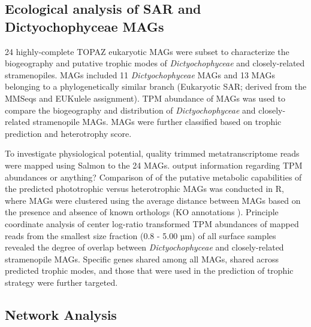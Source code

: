 \documentclass[12pt]{article}
\numberwithin{equation}{section}
\begin{document}
\subsection*{Ecological analysis of SAR and Dictyochophyceae MAGs}
24 highly-complete TOPAZ eukaryotic MAGs were subset to characterize the biogeography and putative trophic modes of \emph{Dictyochophyceae} and closely-related stramenopiles. MAGs included 11 \emph{Dictyochophyceae} MAGs and 13 MAGs belonging to a phylogenetically similar branch (Eukaryotic SAR; derived from the MMSeqs and EUKulele assignment). TPM abundance of MAGs was used to compare the biogeography and distribution of \emph{Dictyochophyceae} and closely-related stramenopile MAGs. MAGs were further classified based on trophic prediction and heterotrophy score. 

To investigate physiological potential, quality trimmed metatranscriptome reads were mapped using Salmon \cite{Patro2017Salmon} to the 24 MAGs. output information regarding TPM abundances or anything? Comparison of of the putative metabolic capabilities of the predicted phototrophic versus heterotrophic MAGs was conducted in R, where MAGs were clustered using the average distance between MAGs based on the presence and absence of known orthologs (KO annotations \citep{Kanehisa_2019}). Principle coordinate analysis of center log-ratio transformed TPM abundances of mapped reads from the smallest size fraction (0.8 - 5.00 µm) of all surface samples revealed the degree of overlap between \emph{Dictyochophyceae} and closely-related stramenopile MAGs. Specific genes shared among all MAGs, shared across predicted trophic modes, and those that were used in the prediction of trophic strategy \citep{} were further targeted.

\subsection*{Network Analysis} 
\end{document}
